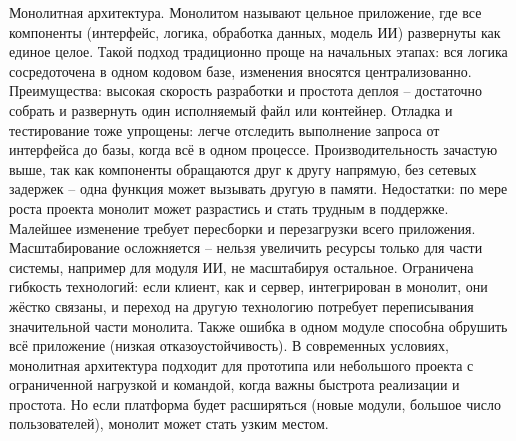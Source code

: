 Монолитная архитектура. Монолитом называют цельное приложение, где все компоненты (интерфейс, логика, обработка данных, модель ИИ) развернуты как единое целое. Такой подход традиционно проще на начальных этапах: вся логика сосредоточена в одном кодовом базе, изменения вносятся централизованно. Преимущества: высокая скорость разработки и простота деплоя – достаточно собрать и развернуть один исполняемый файл или контейнер\cite{atlassian:microservices}. Отладка и тестирование тоже упрощены: легче отследить выполнение запроса от интерфейса до базы, когда всё в одном процессе\cite{atlassian:microservices}.  Производительность зачастую выше, так как компоненты обращаются друг к другу напрямую, без сетевых задержек – одна функция может вызывать другую в памяти. Недостатки: по мере роста проекта монолит может разрастись и стать трудным в поддержке. Малейшее изменение требует пересборки и перезагрузки всего приложения\cite{atlassian:microservices}. Масштабирование осложняется – нельзя увеличить ресурсы только для части системы, например для модуля ИИ, не масштабируя остальное. Ограничена гибкость технологий: если клиент, как и сервер,  интегрирован в монолит, они жёстко связаны, и переход на другую технологию потребует переписывания значительной части монолита. Также ошибка в одном модуле способна обрушить всё приложение (низкая отказоустойчивость)\cite{atlassian:microservices}. В современных условиях, монолитная архитектура подходит для прототипа или небольшого проекта с ограниченной нагрузкой и командой, когда важны быстрота реализации и простота. Но если платформа будет расширяться (новые модули, большое число пользователей), монолит может стать узким местом.

